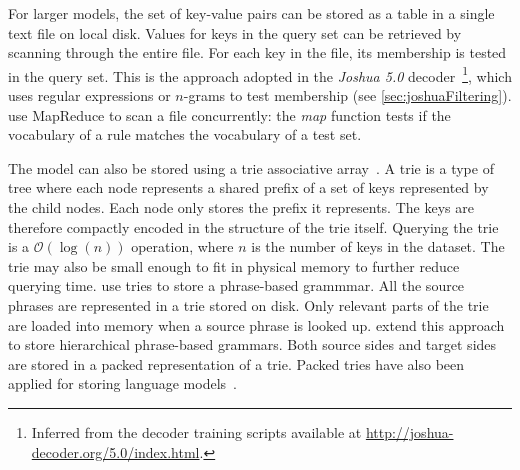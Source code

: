 For larger models, the set of key-value pairs can be stored as a table in a
single text file on local disk. Values for keys in the query set can be retrieved
by scanning through the entire file. For each key in the file, its membership is
tested in the query set. This is the approach adopted in the \emph{Joshua 5.0}
decoder~\citep{post-ganitkevitch-orland-weese-cao-callisonburch:2013:WMT}\footnote{Inferred from the decoder training
scripts available at \url{http://joshua-decoder.org/5.0/index.html}.}, which
uses regular expressions or $n$-grams to test
membership (see \autoref{sec:joshuaFiltering}).
\citet{venugopal-zollmann:2009:PBML} use MapReduce to scan a file concurrently:
the \emph{map} function tests if the vocabulary of a rule matches the
vocabulary of a test set.

The model can also be stored using a trie associative
array~\citep{fredkin:1960:ACM}. A trie is a type of tree where each node
represents a shared prefix of a set of keys represented by the child nodes. Each
node only stores the prefix it represents. The keys are therefore compactly
encoded in the structure of the trie itself. Querying the trie is a
$\mathcal{O}(\log(n))$ operation, where $n$ is the number of keys in the
dataset. The trie may also be small enough to fit in physical memory to further
reduce querying time. \citet{zens-ney:2007:HLTNAACL} use tries
to store a phrase-based grammmar. All the source phrases are represented
in a trie stored on disk. Only relevant parts of the trie are loaded into
memory when a source phrase is looked up.
\citet{ganitkevitch-cao-weese-post-callisonburch:2012:WMT} extend this
approach to store hierarchical phrase-based grammars. Both
source sides and target sides are stored in a packed representation of a trie.
Packed tries have also been applied for storing language
models~\citep{pauls-klein:2011:HLTACL,heafield:2011:WMT}.

